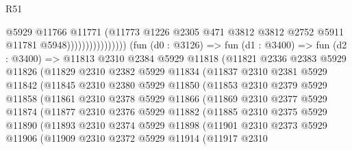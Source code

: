 \begin{lexlean}{R51}
\begin{coremodule}
                                      @5929
                                      @11766
                                      @11771
                                      (@11773
                                        @1226
                                        @2305
                                        @471
                                        @3812
                                        @3812
                                        @2752
                                        @5911
                                        @11781
                                        @5948))))))))))))))))
        (fun (d0 : @3126) =>
        fun (d1 : @3400) =>
        fun (d2 : @3400) =>
        @11813
          @2310
          @2384
          @5929
          @11818
          (@11821
            @2336
            @2383
            @5929
            @11826
            (@11829
              @2310
              @2382
              @5929
              @11834
              (@11837
                @2310
                @2381
                @5929
                @11842
                (@11845
                  @2310
                  @2380
                  @5929
                  @11850
                  (@11853
                    @2310
                    @2379
                    @5929
                    @11858
                    (@11861
                      @2310
                      @2378
                      @5929
                      @11866
                      (@11869
                        @2310
                        @2377
                        @5929
                        @11874
                        (@11877
                          @2310
                          @2376
                          @5929
                          @11882
                          (@11885
                            @2310
                            @2375
                            @5929
                            @11890
                            (@11893
                              @2310
                              @2374
                              @5929
                              @11898
                              (@11901
                                @2310
                                @2373
                                @5929
                                @11906
                                (@11909
                                  @2310
                                  @2372
                                  @5929
                                  @11914
                                  (@11917
                                    @2310

\end{coremodule}
\end{lexlean}

